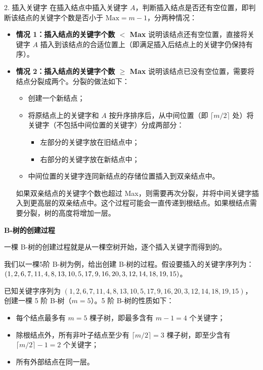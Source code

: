 \documentclass[lang=cn,newtx,10pt,scheme=chinese]{../elegantbook}
\begin{document}
2. 插入关键字  
   在插入结点中插入关键字 $A$，判断插入结点是否还有空位置，即判断该结点的关键字个数是否小于 $\text{Max} = m-1$，分两种情况：
   \begin{itemize}
     \item \textbf{情况 1：插入结点的关键字个数 $<$ Max}  
       说明该结点还有空位置，直接将关键字 $A$ 插入到该结点的合适位置上（即满足插入后结点上的关键字仍保持有序）。
     \item \textbf{情况 2：插入结点的关键字个数 $\geq$ Max}  
       说明该结点已没有空位置，需要将结点分裂成两个。分裂的做法如下：
       \begin{itemize}
         \item 创建一个新结点；
         \item 将原结点上的关键字和 $A$ 按升序排序后，从中间位置（即 $\lceil m/2 \rceil$ 处）将关键字（不包括中间位置的关键字）分成两部分：
           \begin{itemize}
             \item 左部分的关键字放在旧结点中；
             \item 右部分的关键字放在新结点中；
           \end{itemize}
         \item 中间位置的关键字连同新结点的存储位置插入到双亲结点中。
       \end{itemize}
       如果双亲结点的关键字个数也超过 Max，则需要再次分裂，并将中间关键字插入到更高层的双亲结点中。这个过程可能会一直传递到根结点。如果根结点需要分裂，树的高度将增加一层。
   \end{itemize}


\textbf{B-树的创建过程}  

一棵 B-树的创建过程就是从一棵空树开始，逐个插入关键字而得到的。

我们以一棵5阶 B-树为例，给出创建 B-树的过程。假设要插入的关键字序列为：$(1, 2, 6, 7, 11, 4, 8, 13, 10, \\
5, 17, 9, 16, 20, 3, 12, 14, 18, 19, 15)$。

已知关键字序列为 $(1, 2, 6, 7, 11, 4, 8, 13, 10, 5, 17, 9, 16, 20, 3, 12, 14, 18, 19, 15)$，创建一棵 5 阶 B-树（$m=5$）。5 阶 B-树的性质如下：
\begin{itemize}
  \item 每个结点最多有 $m = 5$ 棵子树，即最多含有 $m-1 = 4$ 个关键字；
  \item 除根结点外，所有非叶子结点至少有 $\lceil m/2 \rceil = 3$ 棵子树，即至少含有 $\lceil m/2 \rceil - 1 = 2$ 个关键字；
  \item 所有外部结点在同一层。
\end{itemize}
\end{document}
